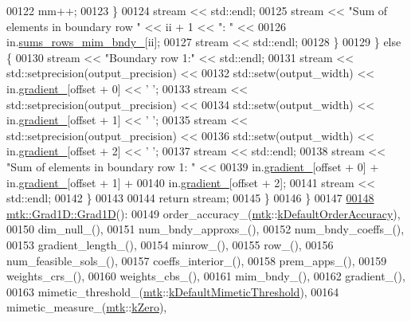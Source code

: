 \begin{DoxyCode}
00122         mm++;
00123       \}
00124       stream << std::endl;
00125       stream << \textcolor{stringliteral}{"Sum of elements in boundary row "} << ii + 1 << \textcolor{stringliteral}{": "} <<
00126         in.\hyperlink{classmtk_1_1Grad1D_ab8858a35339ed7036083d25b23293737}{sums\_rows\_mim\_bndy\_}[ii];
00127       stream << std::endl;
00128     \}
00129   \} \textcolor{keywordflow}{else} \{
00130     stream << \textcolor{stringliteral}{"Boundary row 1:"} << std::endl;
00131     stream << std::setprecision(output\_precision) <<
00132         std::setw(output\_width) << in.\hyperlink{classmtk_1_1Grad1D_a024b84b1ea285c0c590eb42d40ff4469}{gradient\_}[offset + 0] << \textcolor{charliteral}{' '};
00133     stream << std::setprecision(output\_precision) <<
00134         std::setw(output\_width) << in.\hyperlink{classmtk_1_1Grad1D_a024b84b1ea285c0c590eb42d40ff4469}{gradient\_}[offset + 1] << \textcolor{charliteral}{' '};
00135     stream << std::setprecision(output\_precision) <<
00136         std::setw(output\_width) << in.\hyperlink{classmtk_1_1Grad1D_a024b84b1ea285c0c590eb42d40ff4469}{gradient\_}[offset + 2] << \textcolor{charliteral}{' '};
00137     stream << std::endl;
00138     stream << \textcolor{stringliteral}{"Sum of elements in boundary row 1: "} <<
00139       in.\hyperlink{classmtk_1_1Grad1D_a024b84b1ea285c0c590eb42d40ff4469}{gradient\_}[offset + 0] + in.\hyperlink{classmtk_1_1Grad1D_a024b84b1ea285c0c590eb42d40ff4469}{gradient\_}[offset + 1] +
00140         in.\hyperlink{classmtk_1_1Grad1D_a024b84b1ea285c0c590eb42d40ff4469}{gradient\_}[offset + 2];
00141     stream << std::endl;
00142   \}
00143 
00144   \textcolor{keywordflow}{return} stream;
00145 \}
00146 \}
00147 
\hypertarget{mtk__grad__1d_8cc_source_l00148}{}\hyperlink{classmtk_1_1Grad1D_ae21e6ac2652e653c48f15b304ee83a75}{00148} \hyperlink{classmtk_1_1Grad1D_ae21e6ac2652e653c48f15b304ee83a75}{mtk::Grad1D::Grad1D}():
00149   order\_accuracy\_(\hyperlink{namespacemtk}{mtk}::\hyperlink{group__c01-roots_ga0d95560098eb36420511103637b6952f}{kDefaultOrderAccuracy}),
00150   dim\_null\_(),
00151   num\_bndy\_approxs\_(),
00152   num\_bndy\_coeffs\_(),
00153   gradient\_length\_(),
00154   minrow\_(),
00155   row\_(),
00156   num\_feasible\_sols\_(),
00157   coeffs\_interior\_(),
00158   prem\_apps\_(),
00159   weights\_crs\_(),
00160   weights\_cbs\_(),
00161   mim\_bndy\_(),
00162   gradient\_(),
00163   mimetic\_threshold\_(\hyperlink{namespacemtk}{mtk}::\hyperlink{group__c01-roots_ga35718d949bdc81a08a9cc8ebbe3478a2}{kDefaultMimeticThreshold}),
00164   mimetic\_measure\_(\hyperlink{namespacemtk}{mtk}::\hyperlink{group__c01-roots_ga59a451a5fae30d59649bcda274fea271}{kZero}),

\end{DoxyCode}

